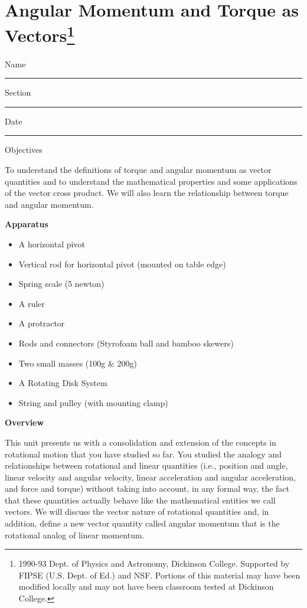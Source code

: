 \def\bmath#1{\mbox{\boldmath$#1$}} 


\section{Angular Momentum and Torque as Vectors\footnote{
1990-93 Dept. of Physics and Astronomy, Dickinson College. Supported by FIPSE
(U.S. Dept. of Ed.) and NSF. Portions of this material may have been modified
locally and may not have been classroom tested at Dickinson College.
}}

Name \rule{2.0in}{0.1pt}\hfill{}Section \rule{1.0in}{0.1pt}\hfill{}Date \rule{1.0in}{0.1pt}

Objectives 

To understand the definitions of torque and angular momentum as vector quantities
and to understand the mathematical properties and some applications of the vector
cross product. We will also learn the relationship between torque and angular
momentum.

\textbf{Apparatus}

\begin{itemize}
\item A horizontal pivot
\item Vertical rod for horizontal pivot (mounted on table edge)
\item Spring scale (5 newton)
\item A ruler 
\item A protractor 
\item Rods and connectors (Styrofoam ball and bamboo skewers)
\item Two small masses (100g \& 200g) 
\item A Rotating Disk System 
\item String and pulley (with mounting clamp)
\end{itemize}
\textbf{Overview} 

This unit presents us with a consolidation and extension of the concepts in
rotational motion that you have studied so far. You studied the analogy and
relationships between rotational and linear quantities (i.e., position and angle,
linear velocity and angular velocity, linear acceleration and angular acceleration,
and force and torque) without taking into account, in any formal way, the fact
that these quantities actually behave like the mathematical entities we call
vectors. We will discuss the vector nature of rotational quantities and, in
addition, define a new vector quantity called angular momentum that is the rotational
analog of linear momentum. 

